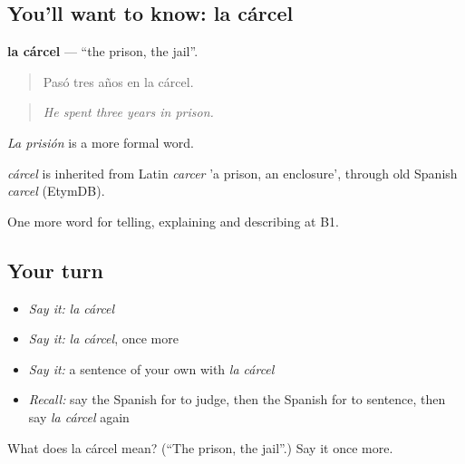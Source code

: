 \subsection*{You'll want to know: la cárcel}
\textbf{la cárcel} — \textquotedblleft{}the prison, the jail\textquotedblright{}.

\begin{quote}
Pasó tres años en la cárcel.
\end{quote}

\begin{quote}
\emph{He spent three years in prison.}
\end{quote}

\emph{La prisión} is a more formal word.

\begin{cousinweb}
\emph{cárcel} is inherited from Latin \emph{carcer} 'a prison, an enclosure', through old Spanish \emph{carcel} (EtymDB).
\end{cousinweb}

\begin{grammarlens}[title={What you've built}]
One more word for telling, explaining and describing at B1.
\end{grammarlens}

\subsection*{Your turn}
\begin{itemize}
\raggedright
  \item \emph{Say it:} \emph{la cárcel}
  \item \emph{Say it:} \emph{la cárcel}, once more
  \item \emph{Say it:} a sentence of your own with \emph{la cárcel}
  \item \emph{Recall:} say the Spanish for to judge, then the Spanish for to sentence, then say \emph{la cárcel} again
\end{itemize}

\begin{tcolorbox}[breakable,colback=teal!4,colframe=teal!35!black,title={Before you move on}]
What does la cárcel mean? (\textquotedblleft{}The prison, the jail\textquotedblright{}.) Say it once more.
\end{tcolorbox}
